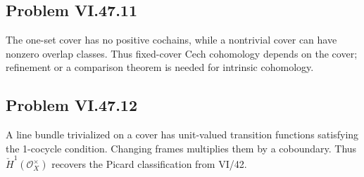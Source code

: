 \subsection*{Problem VI.47.11}
\begin{solution}
The one-set cover has no positive cochains, while a nontrivial cover can have nonzero overlap classes.  Thus fixed-cover Cech cohomology depends on the cover; refinement or a comparison theorem is needed for intrinsic cohomology.
\end{solution}

\subsection*{Problem VI.47.12}
\begin{solution}
A line bundle trivialized on a cover has unit-valued transition functions satisfying the 1-cocycle condition.  Changing frames multiplies them by a coboundary.  Thus \(\check H^1(\mathcal O_X^\times)\) recovers the Picard classification from VI/42.
\end{solution}


